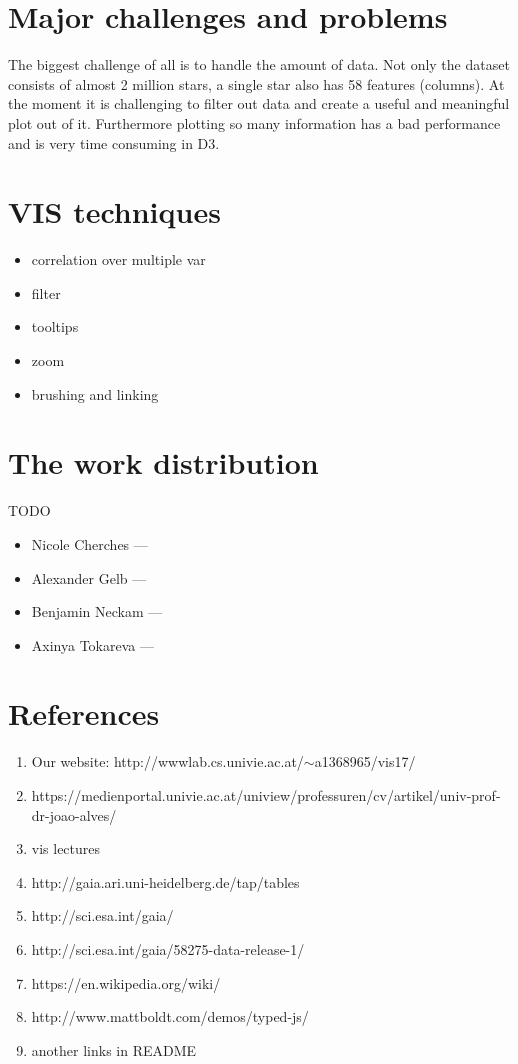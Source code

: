 \documentclass{article}
\begin{document}
\section{Major challenges and problems}
The biggest challenge of all is to handle the amount of data. Not only the dataset consists of almost 2 million stars, a single star also has 58 features (columns). At the moment it is challenging to filter out data and create a useful and meaningful plot out of it.  Furthermore plotting so many information has a bad performance and is very time consuming in D3.

\section {VIS techniques}
\begin{itemize}
\item correlation over multiple var
\item filter
\item tooltips
\item zoom
\item brushing and linking
\end{itemize}

\section {The work distribution}
TODO

\begin{itemize}
\item Nicole Cherches —
\item Alexander Gelb —
\item Benjamin Neckam —
\item Axinya Tokareva — 
\end{itemize}

\section {References}
\begin{enumerate}
\item Our website: http://wwwlab.cs.univie.ac.at/$\sim$a1368965/vis17/
\item https://medienportal.univie.ac.at/uniview/professuren/cv/artikel/univ-prof-dr-joao-alves/
\item vis lectures
\item http://gaia.ari.uni-heidelberg.de/tap/tables
\item http://sci.esa.int/gaia/
\item http://sci.esa.int/gaia/58275-data-release-1/
\item https://en.wikipedia.org/wiki/
\item http://www.mattboldt.com/demos/typed-js/
\item another links in README
\end{enumerate}
\end{document}
